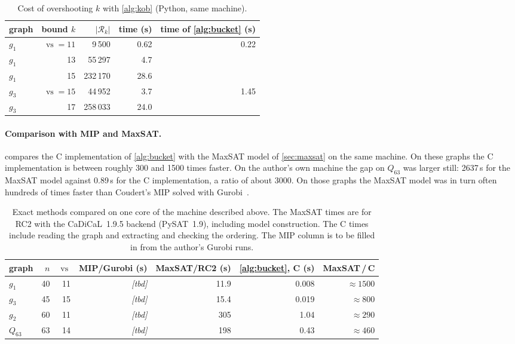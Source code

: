 \documentclass[11pt]{article}
\theoremstyle{definition}
\newcommand{\vs}{\operatorname{vs}}
\newcommand{\Rel}{\mathcal{R}}
\begin{document}
\begin{table}[ht]
\centering
\begin{tabular}{lrrrr}
\toprule
graph & bound $k$ & $|\Rel_k|$ & time (s) & time of \cref{alg:bucket} (s)\\
\midrule
$g_1$ & $\vs=11$ & 9\,500 & 0.62 & 0.22\\
$g_1$ & 13 & 55\,297 & 4.7 & \\
$g_1$ & 15 & 232\,170 & 28.6 & \\
$g_3$ & $\vs=15$ & 44\,952 & 3.7 & 1.45\\
$g_3$ & 17 & 258\,033 & 24.0 & \\
\bottomrule
\end{tabular}
\caption{Cost of overshooting $k$ with \cref{alg:kob} (Python, same
machine).}\label{tab:overshoot}
\end{table}

\paragraph{Comparison with MIP and MaxSAT.}
 compares the C implementation of \cref{alg:bucket} with the
MaxSAT model of \cref{sec:maxsat} on the same machine. On these graphs the
C implementation is between roughly 300 and 1500 times faster. On the
author's own machine the gap on $Q_{63}$ was larger still: 2637\,s for the
MaxSAT model against 0.89\,s for the C implementation, a ratio of about
3000. On those graphs
the MaxSAT model was in turn often hundreds of times faster than Coudert's
MIP solved with Gurobi~\cite{Gurobi}.

\begin{table}[ht]
\centering
\begin{tabular}{lrrrrrr}
\toprule
graph & $n$ & $\vs$ & MIP/Gurobi (s) & MaxSAT/RC2 (s) & \cref{alg:bucket}, C (s) & MaxSAT\,/\,C\\
\midrule
$g_1$ & 40 & 11 & \emph{[tbd]} & 11.9 & 0.008 & $\approx 1500$\\
$g_3$ & 45 & 15 & \emph{[tbd]} & 15.4 & 0.019 & $\approx 800$\\
$g_2$ & 60 & 11 & \emph{[tbd]} & 305 & 1.04 & $\approx 290$\\
$Q_{63}$ & 63 & 14 & \emph{[tbd]} & 198 & 0.43 & $\approx 460$\\
\bottomrule
\end{tabular}
\caption{Exact methods compared on one core of the machine described above.
The MaxSAT times are for RC2 with the CaDiCaL~1.9.5 backend (PySAT~1.9),
including model construction. The C times include reading the graph and
extracting and checking the ordering. The MIP column is to be filled in from
the author's Gurobi runs.}\label{tab:mip}
\end{table}
\end{document}
